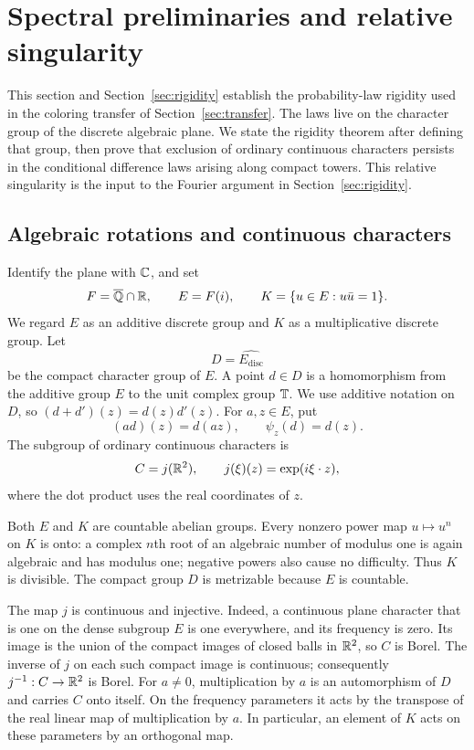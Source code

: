 \section{Spectral preliminaries and relative singularity}
\label{sec:spectral}

This section and Section~\ref{sec:rigidity} establish the probability-law
rigidity used in the coloring transfer of Section~\ref{sec:transfer}.
The laws live on the character group of the discrete algebraic plane.
We state the rigidity theorem after defining that group, then prove
that exclusion of ordinary continuous characters persists in the
conditional difference laws arising along compact towers.  This
relative singularity is the input to the Fourier argument in
Section~\ref{sec:rigidity}.

\subsection{Algebraic rotations and continuous characters}

\begin{definition}\label{def:spectral-groups}
Identify the plane with $\mathbb C$, and set
\[
 F=\overline{\mathbb Q}\cap\mathbb R,\qquad E=F(i),\qquad
 K=\{u\in E:u\bar u=1\}.
\]
We regard $E$ as an additive discrete group and $K$ as a multiplicative
discrete group. Let
\[
 D=\widehat{E_{\mathrm{disc}}}
\]
be the compact character group of $E$. A point $d\in D$ is a homomorphism
from the additive group $E$ to the unit complex group $\mathbb T$. We use additive
notation on $D$, so $(d+d')(z)=d(z)d'(z)$. For $a,z\in E$, put
\[
 (ad)(z)=d(az),\qquad \psi_z(d)=d(z).
\]
The subgroup of ordinary continuous characters is
\begin{equation}\label{eq:spectral-continuous-characters}
 C=j(\mathbb R^2),\qquad
 j(\xi)(z)=\exp(i\xi\cdot z),
\end{equation}
where the dot product uses the real coordinates of $z$.
\end{definition}

Both $E$ and $K$ are countable abelian groups. Every nonzero power map
$u\mapsto u^n$ on $K$ is onto: a complex $n$th root of an algebraic number
of modulus one is again algebraic and has modulus one; negative powers
also cause no difficulty. Thus $K$ is divisible. The compact group $D$ is
metrizable because $E$ is countable.

The map $j$ is continuous and injective. Indeed, a continuous plane
character that is one on the dense subgroup $E$ is one everywhere, and
its frequency is zero. Its image is the union of the compact images of
closed balls in $\mathbb R^2$, so $C$ is Borel. The inverse of $j$ on each such
compact image is continuous; consequently $j^{-1}:C\to\mathbb R^2$ is Borel.
For $a\ne0$, multiplication by $a$ is an automorphism of $D$ and carries
$C$ onto itself. On the frequency parameters it acts by the transpose
of the real linear map of multiplication by $a$. In particular, an
element of $K$ acts on these parameters by an orthogonal map.

